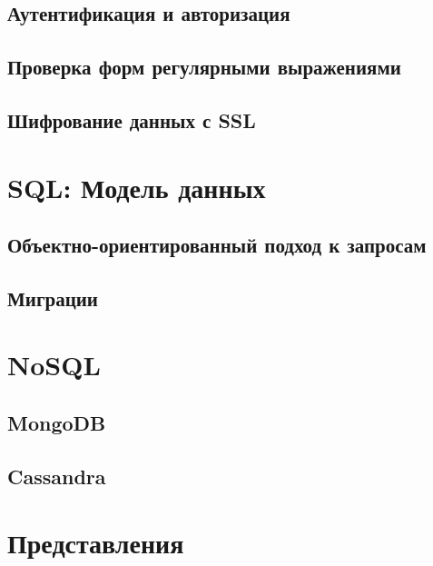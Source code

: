 

\subsection{Аутентификация и авторизация}

\subsection{Проверка форм регулярными выражениями}

\subsection{Шифрование данных с SSL}

\section{SQL: Модель данных}

\subsection{Объектно-ориентированный подход к запросам}

\subsection{Миграции}

\section{NoSQL}

\subsection{MongoDB}

\subsection{Cassandra}

\section{Представления}


